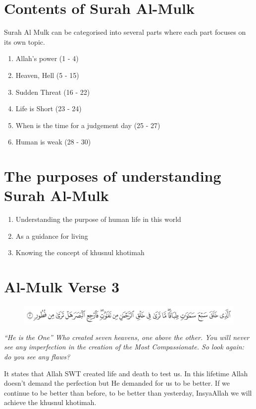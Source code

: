 \documentclass[12pt,titlepage]{article}
\begin{document}
\section{Contents of Surah Al-Mulk}
Surah Al Mulk can be categorised into several parts where each part focuses on its own topic.
\begin{enumerate}
    \item Allah's power (1 - 4)
    \item Heaven, Hell (5 - 15)
    \item Sudden Threat (16 - 22)
    \item Life is Short (23 - 24)
    \item When is the time for a judgement day (25 - 27)
    \item Human is weak (28 - 30)
\end{enumerate}

\section{The purposes of understanding Surah Al-Mulk}
\begin{enumerate}
    \item Understanding the purpose of human life in this world
    \item As a guidance for living
    \item Knowing the concept of khusnul khotimah
\end{enumerate}

\pagebreak

\section{Al-Mulk Verse 3}
\begin{figure}[h]
    \includegraphics[width=\textwidth]{images/verse-3.png}
\end{figure}
\textit{
    ``He is the One'' Who created seven heavens, one above the other.
    You will never see any imperfection in the creation of the Most Compassionate.
    So look again: do you see any flaws?
}

\vspace{5mm}

It states that Allah SWT created life and death to test us. In this lifetime Allah doesn’t
demand the perfection but He demanded for us to be better.
If we continue to be better than before, to be better than yesterday, InsyaAllah we will achieve the khusnul khotimah.
\end{document}
